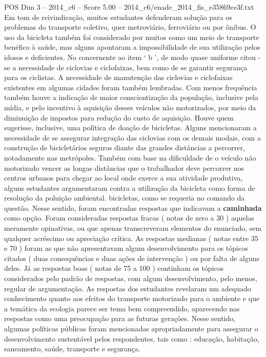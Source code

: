 \begin{textsample}{POS Dim 3 – 2014\_c6 – Score 5.00 – 2014\_c6/enade\_2014\_fis\_e35869ce3f.txt}
Em tom de reivindicação, muitos estudantes defenderam solução para os problemas do transporte coletivo, quer metroviário, ferroviário ou por ônibus.
O uso da bicicleta também foi considerado por muitos como um meio de transporte benéfico à saúde, mas alguns apontaram a impossibilidade de sua utilização pelos idosos e deficientes.
No concernente ao item ‘ b ’, de modo quase uniforme citou -se a necessidade de ciclovias e ciclofaixas, bem como de se garantir segurança para os ciclistas.
A necessidade de manutenção das ciclovias e ciclofaixas existentes em algumas cidades foram também lembradas.
Com menos frequência também houve a indicação de maior conscientização da população, inclusive pela mídia, e pelo incentivo à aquisição desses veículos não motorizados, por meio da diminuição de impostos para redução do custo de aquisição.
Houve quem sugerisse, inclusive, uma política de doação de bicicletas.
Alguns mencionaram a necessidade de se assegurar integração das ciclovias com os demais modais, com a construção de bicicletários seguros diante das grandes distâncias a percorrer, notadamente nas metrópoles.
Também com base na dificuldade de o veículo não motorizado vencer as longas distâncias que o trabalhador deve percorrer nos centros urbanos para chegar ao local onde exerce a sua atividade produtiva, alguns estudantes argumentaram contra a utilização da bicicleta como forma de resolução da poluição ambiental. bicicletas, como se requeria no comando da questão.
Nesse sentido, foram encontradas respostas que indicavam a \textbf{caminhada} como opção.
Foram consideradas respostas fracas ( notas de zero a 30 ) aquelas meramente opinativas, ou que apenas transcreveram elementos do enunciado, sem qualquer acréscimo ou apreciação crítica.
As respostas medianas ( notas entre 35 e 70 ) foram as que não apresentavam algum desenvolvimento para os tópicos citados ( duas consequências e duas ações de intervenção ) ou por falta de alguns deles.
Já as respostas boas ( notas de 75 a 100 ) continham os tópicos considerados pelo padrão de respostas, com algum desenvolvimento, pelo menos, regular de argumentação.
As respostas dos estudantes revelaram um adequado conhecimento quanto aos efeitos do transporte motorizado para o ambiente e que a temática da ecologia parece ser tema bem compreendido, aparecendo nas respostas como uma preocupação para as futuras gerações.
Nesse sentido, algumas políticas públicas foram mencionadas apropriadamente para assegurar o desenvolvimento sustentável pelos respondentes, tais como : educação, habitação, saneamento, saúde, transporte e segurança.

\end{textsample}

